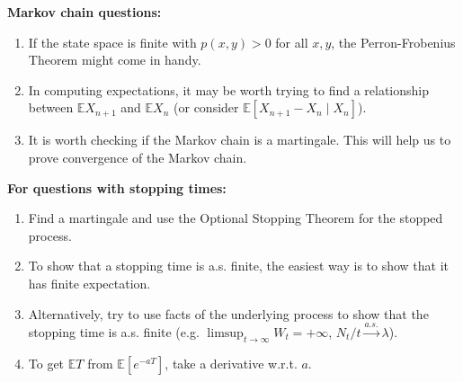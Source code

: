 \documentclass[twoside]{article}
\newcommand\bbE{\mathbb{E}}
\newcommand\lmb{\lambda}
\newcommand\goesto{\rightarrow}
\begin{document}
\textbf{Markov chain questions:}
\begin{enumerate}
\item If the state space is finite with $p(x,y) > 0$ for all $x, y$, the Perron-Frobenius Theorem might come in handy.

\item In computing expectations, it may be worth trying to find a relationship between $\bbE X_{n+1}$ and $\bbE X_n$ (or consider $\bbE [X_{n+1} - X_n \mid X_n ]$).

\item It is worth checking if the Markov chain is a martingale. This will help us to prove convergence of the Markov chain.

\end{enumerate}

\textbf{For questions with stopping times:}
\begin{enumerate}
\item Find a martingale and use the Optional Stopping Theorem for the stopped process.

\item To show that a stopping time is a.s. finite, the easiest way is to show that it has finite expectation. 

\item Alternatively, try to use facts of the underlying process to show that the stopping time is a.s. finite (e.g. $\limsup_{t \goesto \infty} W_t = +\infty$, $N_t / t \stackrel{a.s.}{\goesto} \lmb$).

\item To get $\bbE T$ from $\bbE [e^{-aT}]$, take a derivative w.r.t. $a$.
\end{enumerate}
\end{document}
